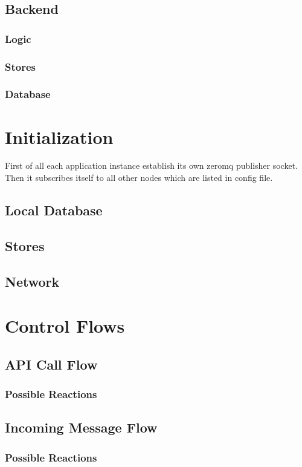 \subsection{Backend}
\subsubsection{Logic}
\subsubsection{Stores}
\subsubsection{Database}

\section{Initialization}
First of all each application instance establish its own zeromq publisher socket. Then it subscribes
itself to all other nodes which are listed in config file.
\subsection{Local Database}
\subsection{Stores}
\subsection{Network}

\section{Control Flows}
\subsection{API Call Flow}
\subsubsection{Possible Reactions}
\subsection{Incoming Message Flow}
\subsubsection{Possible Reactions}

